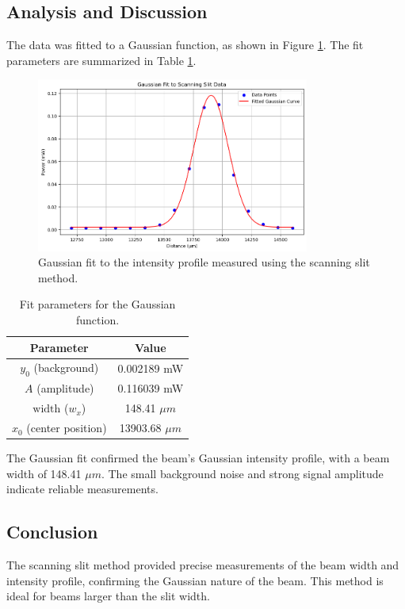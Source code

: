 \documentclass[12pt]{article}
\begin{document}
\subsection{Analysis and Discussion}
The data was fitted to a Gaussian function, as shown in Figure \ref{fig:gaussian_fit}. The fit parameters are summarized in Table \ref{tab:fit_parameters}.

\begin{figure}[h!]
    \centering
    \includegraphics[width=0.8\textwidth]{output.png}
    \caption{Gaussian fit to the intensity profile measured using the scanning slit method.}
    \label{fig:gaussian_fit}
\end{figure}

\begin{table}[h!]
    \centering
    \begin{tabular}{|c|c|}
        \hline
        \textbf{Parameter} & \textbf{Value} \\
        \hline
        \( y_0 \) (background) & 0.002189 mW \\
        \( A \) (amplitude) & 0.116039 mW \\
        \( \text{width} \) (\( w_x \)) & 148.41 \(\mu m\) \\
        \( x_0 \) (center position) & 13903.68 \(\mu m\) \\
        \hline
    \end{tabular}
    \caption{Fit parameters for the Gaussian function.}
    \label{tab:fit_parameters}
\end{table}

The Gaussian fit confirmed the beam's Gaussian intensity profile, with a beam width of 148.41 \(\mu m\). The small background noise and strong signal amplitude indicate reliable measurements.

\subsection{Conclusion}
The scanning slit method provided precise measurements of the beam width and intensity profile, confirming the Gaussian nature of the beam. This method is ideal for beams larger than the slit width.
\end{document}
